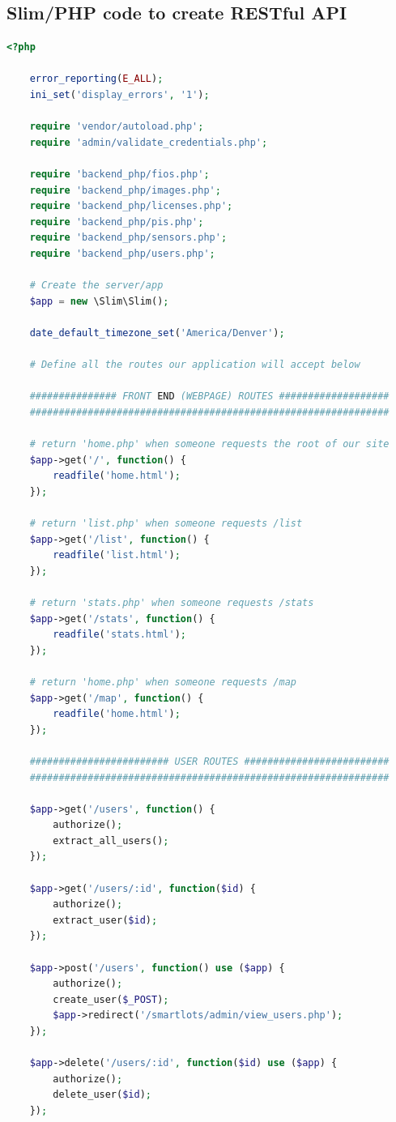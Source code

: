 \documentclass[11pt, oneside, fullpage, doublespace]{article}
\begin{document}
\subsection*{Slim/PHP code to create RESTful API}
\begin{spacing}{1}
\begin{lstlisting}[language=php]
<?php
	
	error_reporting(E_ALL);
	ini_set('display_errors', '1');

	require 'vendor/autoload.php';
	require 'admin/validate_credentials.php';

	require 'backend_php/fios.php';
	require 'backend_php/images.php';
	require 'backend_php/licenses.php';
	require 'backend_php/pis.php';
	require 'backend_php/sensors.php';
	require 'backend_php/users.php';

	# Create the server/app
	$app = new \Slim\Slim();

	date_default_timezone_set('America/Denver');

	# Define all the routes our application will accept below

	############### FRONT END (WEBPAGE) ROUTES ###################
	##############################################################

	# return 'home.php' when someone requests the root of our site
	$app->get('/', function() {
		readfile('home.html');
	});

	# return 'list.php' when someone requests /list
	$app->get('/list', function() {
		readfile('list.html');
	});

	# return 'stats.php' when someone requests /stats
	$app->get('/stats', function() {
		readfile('stats.html');
	});

	# return 'home.php' when someone requests /map
	$app->get('/map', function() {
		readfile('home.html');
	});

	######################## USER ROUTES #########################
	##############################################################

	$app->get('/users', function() {
		authorize();
		extract_all_users();
	});

	$app->get('/users/:id', function($id) {
		authorize();
		extract_user($id);
	});

	$app->post('/users', function() use ($app) {
		authorize();
		create_user($_POST);
		$app->redirect('/smartlots/admin/view_users.php');
	});

	$app->delete('/users/:id', function($id) use ($app) {
		authorize();
		delete_user($id);
	});


\end{lstlisting}
\end{spacing}
\end{document}
